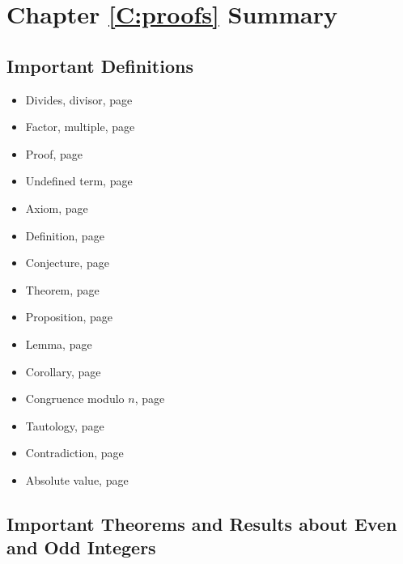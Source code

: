 \section{Chapter \ref{C:proofs} Summary} \label{Su:proofs}

\subsection*{Important Definitions}
\begin{multicols}{2}
\begin{itemize}
\item Divides, divisor, page~\pageref*{divides}
\item Factor, multiple, page~\pageref*{divides}
\item Proof, page~\pageref*{proof}
\item Undefined term, page~\pageref*{undefined}
\item Axiom, page~\pageref*{axiom}
\item Definition, page~\pageref*{definition}
\item Conjecture, page~\pageref*{conjecture}
\item Theorem, page~\pageref*{theorem}
\item Proposition, page~\pageref*{proposition}
\item Lemma, page~\pageref*{lemma}
\item Corollary, page~\pageref*{corollary}
\item Congruence modulo $n$, page~\pageref*{congruence}
\item Tautology, page~\pageref*{D:tautology}
\item Contradiction, page~\pageref*{D:tautology}
\item Absolute value, page~\pageref*{D:absvalue}
\end{itemize}
\end{multicols}
\hbreak



\subsection*{Important Theorems and Results about Even and Odd Integers} \label{SS:evenodd}
{}%
%

